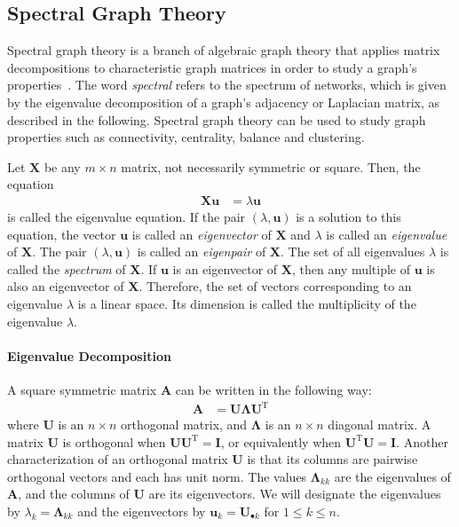 \documentclass[11pt,a4paper]{book}
\begin{document}
\subsection{Spectral Graph Theory}
\label{sec:spectral-spectral-graph-theory}
Spectral graph theory is a branch of algebraic graph theory that applies
matrix decompositions to characteristic graph matrices in order
to study a graph's properties~\cite{b285,b117}.  
The word \emph{spectral} refers to the
spectrum of networks, which is given by the eigenvalue decomposition of a
graph's adjacency or Laplacian matrix, as described in the following.  
Spectral graph theory can be used to study graph properties such as
connectivity, centrality, balance and clustering. 

Let $\mathbf X$ be any $m \times n$ matrix, not necessarily symmetric or
square.  Then, the equation 
\begin{align}
\mathbf X \mathbf u &= \lambda \mathbf u
\end{align}
is called the eigenvalue equation.  If the pair $(\lambda, \mathbf u)$
is a solution to 
this equation, the vector
$\mathbf u$ is called an \emph{eigenvector} of $\mathbf X$ and $\lambda$
is called an \emph{eigenvalue} of $\mathbf X$.  The pair $(\lambda,
\mathbf u)$ is called an \emph{eigenpair} of $\mathbf X$.
The set of all
eigenvalues $\lambda$ is called the
\emph{spectrum} of $\mathbf X$.  
If $\mathbf u$ is an eigenvector of $\mathbf X$, then any 
multiple of $\mathbf u$ is also an eigenvector of $\mathbf
X$. Therefore, the set of vectors corresponding to an eigenvalue
$\lambda$ is a linear space.  Its dimension is called the multiplicity
of the eigenvalue $\lambda$. 

\paragraph{Eigenvalue Decomposition}
\label{para:eigenvalue-decomposition}
A square symmetric matrix $\mathbf A$ can be written in the following way:
\begin{align}
  \mathbf A &= \mathbf U \mathbf \Lambda \mathbf U^{\mathrm T}
  \label{eq:eigenvalue-decomposition}
\end{align}
where $\mathbf U$ is an $n\times n$ orthogonal matrix, and $\mathbf \Lambda$ is
an $n \times n$ diagonal matrix.  
A matrix $\mathbf U$ is orthogonal when $\mathbf U \mathbf U^{\mathrm T} = \mathbf
I$, or equivalently when $\mathbf U^{\mathrm T} \mathbf U = \mathbf I$.  
Another characterization of an orthogonal matrix $\mathbf U$ is that its
columns are pairwise orthogonal vectors and each has unit norm. 
The values $\mathbf \Lambda_{kk}$ are
the eigenvalues of $\mathbf A$, and the columns of $\mathbf U$ are its
eigenvectors.  We will designate the eigenvalues by
$\lambda_k = \mathbf \Lambda_{kk}$ and the eigenvectors by $\mathbf u_k =
\mathbf U_{\bullet k}$ for $1 \leq k \leq n$.  
\end{document}
